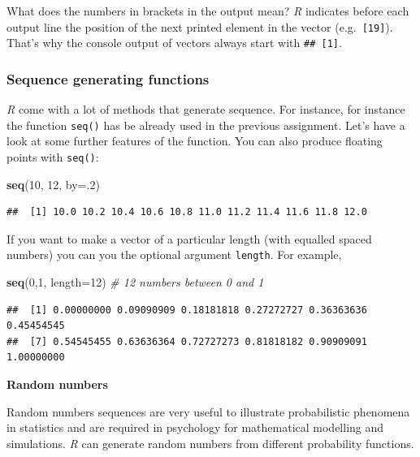 \documentclass[
]{scrartcl}
\newenvironment{Shaded}{\begin{snugshade}}{\end{snugshade}}
\newcommand{\AttributeTok}[1]{\textcolor[rgb]{0.13,0.29,0.53}{#1}}
\newcommand{\CommentTok}[1]{\textcolor[rgb]{0.56,0.35,0.01}{\textit{#1}}}
\newcommand{\DecValTok}[1]{\textcolor[rgb]{0.00,0.00,0.81}{#1}}
\newcommand{\FunctionTok}[1]{\textcolor[rgb]{0.13,0.29,0.53}{\textbf{#1}}}
\newcommand{\NormalTok}[1]{#1}
\begin{document}
What does the numbers in brackets in the output mean? \emph{R} indicates before each output line the position of the next printed element in the vector (e.g.~\texttt{{[}19{]}}). That's why the console output of vectors always start with \texttt{\#\#\ {[}1{]}}.

\hypertarget{sequence-generating-functions}{%
\subsubsection{Sequence generating functions}\label{sequence-generating-functions}}

\emph{R} come with a lot of methods that generate sequence. For instance, for instance the function \texttt{seq()} has be already used in the previous assignment. Let's have a look at some further features of the function. You can also produce floating points with \texttt{seq()}:

\begin{Shaded}
\begin{Highlighting}[]
\FunctionTok{seq}\NormalTok{(}\DecValTok{10}\NormalTok{, }\DecValTok{12}\NormalTok{, }\AttributeTok{by=}\NormalTok{.}\DecValTok{2}\NormalTok{)}
\end{Highlighting}
\end{Shaded}

\begin{verbatim}
##  [1] 10.0 10.2 10.4 10.6 10.8 11.0 11.2 11.4 11.6 11.8 12.0
\end{verbatim}

If you want to make a vector of a particular length (with equalled spaced numbers) you can you the optional argument \texttt{length}. For example,

\begin{Shaded}
\begin{Highlighting}[]
\FunctionTok{seq}\NormalTok{(}\DecValTok{0}\NormalTok{,}\DecValTok{1}\NormalTok{, }\AttributeTok{length=}\DecValTok{12}\NormalTok{) }\CommentTok{\# 12 numbers between 0  and 1}
\end{Highlighting}
\end{Shaded}

\begin{verbatim}
##  [1] 0.00000000 0.09090909 0.18181818 0.27272727 0.36363636 0.45454545
##  [7] 0.54545455 0.63636364 0.72727273 0.81818182 0.90909091 1.00000000
\end{verbatim}

\textbf{Random numbers}

Random numbers sequences are very useful to illustrate probabilistic phenomena in statistics and are required in psychology for mathematical modelling and simulations. \emph{R} can generate random numbers from different probability functions.
\end{document}
